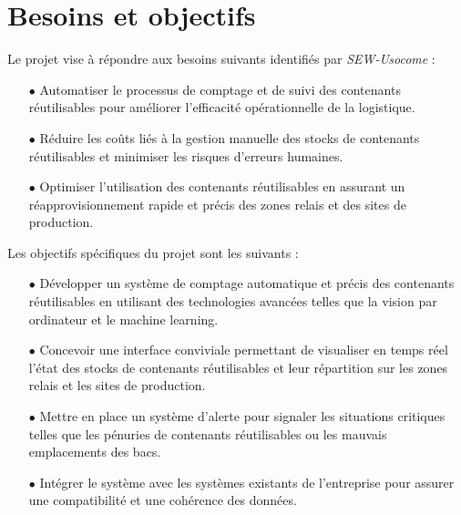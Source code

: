 \section{Besoins et objectifs}

Le projet vise à répondre aux besoins suivants identifiés par \emph{SEW-Usocome} :\\

\begin{itemize}
    \item[$\bullet$] Automatiser le processus de comptage et de suivi des contenants réutilisables pour améliorer l'efficacité opérationnelle de la logistique.
    \item[$\bullet$] Réduire les coûts liés à la gestion manuelle des stocks de contenants réutilisables et minimiser les risques d'erreurs humaines.
    \item[$\bullet$] Optimiser l'utilisation des contenants réutilisables en assurant un réapprovisionnement rapide et précis des zones relais et des sites de production.\\
\end{itemize}

Les objectifs spécifiques du projet sont les suivants :\\

\begin{itemize}
    \item[$\bullet$] Développer un système de comptage automatique et précis des contenants réutilisables en utilisant des technologies avancées telles que la vision par ordinateur et le machine learning.
    \item[$\bullet$] Concevoir une interface conviviale permettant de visualiser en temps réel l'état des stocks de contenants réutilisables et leur répartition sur les zones relais et les sites de production.
    \item[$\bullet$] Mettre en place un système d'alerte pour signaler les situations critiques telles que les pénuries de contenants réutilisables ou les mauvais emplacements des bacs.
    \item[$\bullet$] Intégrer le système avec les systèmes existants de l'entreprise pour assurer une compatibilité et une cohérence des données.\\
\end{itemize}
